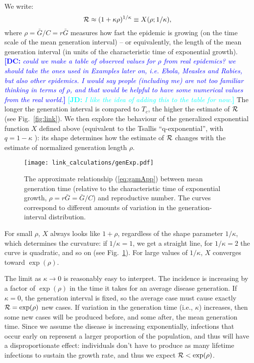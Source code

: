 \documentclass[12pt]{article}
\newcommand{\RR}{\ensuremath{{\cal R}}}
\newcommand{\Tc}{\ensuremath{C}}
\newcommand{\eref}[1]{(\ref{eq:#1})}
\newcommand{\fref}[1]{Fig.~\ref{fig:#1}}
\newcommand{\comment}[3]{\textcolor{#1}{\textbf{[#2: }\textit{#3}\textbf{]}}}
\newcommand{\jd}[1]{\comment{cyan}{JD}{#1}}
\newcommand{\dc}[1]{\comment{blue}{DC}{#1}}
\begin{document}
We write:
\begin{equation}
	\RR \approx (1 + \kappa \rho)^{1/\kappa} \equiv X(\rho; 1/\kappa),
	\label{eq:genExp}
\end{equation}
where $\rho = \bar G/\Tc = r\bar G$ measures how fast the epidemic is growing (on the time scale of the mean generation interval) -- or equivalently, the length of the mean generation interval (in units of the characteristic time of exponential growth).
\dc{could we make a table of observed values for $\rho$ from real epidemics? we should take the ones used in Examples later on, i.e. Ebola, Measles and Rabies, but also other epidemics. I would say people (including me) are not too familiar thinking in terms of $\rho$, and that would be helpful to have some numerical values from the real world.}
\jd{I like the idea of adding this to the table for now.}
The longer the generation interval is compared to $T_c$, the higher the estimate of $\RR$ (see \fref{link}).
We then explore the behaviour of the generalized exponential function $X$ defined above (equivalent to the Tsallis ``q-exponential'', with $q=1-\kappa$ \cite{tsallis1994numbers}): its shape determines how the estimate of $\RR$ changes with the estimate of normalized generation length $\rho$.

\begin{figure}[htbp]
	\centering \texttt{[image: link\_calculations/genExp.pdf]}
	\caption{
		The approximate relationship \eref{gamApp} between mean
		generation time (relative to the characteristic time of
		exponential growth, $\rho = r \bar G = \bar G/\Tc$)
		and reproductive number.
		The curves correspond to different
		amounts of variation in the generation-interval
		distribution. 
	} \label{fig:genExp} 
\end{figure}

For small $\rho$, $X$ always looks like $1+\rho$, regardless of the shape parameter $1/\kappa$, which determines the curvature: if $1/\kappa = 1$, we get a straight line, for $1/\kappa=2$ the curve is quadratic, and so on (see \fref{genExp}).
For large values of $1/\kappa$, $X$ converges toward $\exp(\rho)$.

The limit as $\kappa\to 0$ is reasonably easy to interpret. The incidence is increasing by a factor of $\exp(\rho)$ in the time it takes for an average disease generation. If $\kappa=0$, the generation interval is fixed, so the average case must cause exactly $\RR = \exp(\rho)$ new cases.
If variation in the generation time (i.e., $\kappa$) increases, then some new cases will be produced before, and some after, the mean generation time.
Since we assume the disease is increasing exponentially, infections that occur early on represent a larger proportion of the population, and thus will have a disproportionate effect: individuals don't have to produce as many lifetime infections to sustain the growth rate, and thus we expect  $\RR < \exp(\rho)$.
\end{document}
